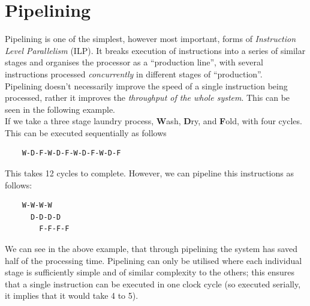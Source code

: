 
\section{Pipelining}
Pipelining is one of the simplest, however most important, forms of \textit{Instruction Level Parallelism} (ILP). It breaks execution of instructions into a series of similar stages and organises the processor as a ``production line'', with several instructions processed \textit{concurrently} in different stages of ``production''.\\

Pipelining doesn't necessarily improve the speed of a single instruction being processed, rather it improves the \textit{throughput of the whole system}. This can be seen in the following example.\\

If we take a three stage laundry process, \textbf{W}ash, \textbf{D}ry, and \textbf{F}old, with four cycles. This can be executed sequentially as follows
\begin{verbatim}
    W-D-F-W-D-F-W-D-F-W-D-F
\end{verbatim}
This takes 12 cycles to complete. However, we can pipeline this instructions as follows:
\begin{verbatim}
    W-W-W-W
      D-D-D-D
        F-F-F-F
\end{verbatim}
We can see in the above example, that through pipelining the system has saved half of the processing time. Pipelining can only be utilised where each individual stage is sufficiently simple and of similar complexity to the others; this ensures that a single instruction can be executed in one clock cycle (so executed serially, it implies that it would take 4 to 5).

